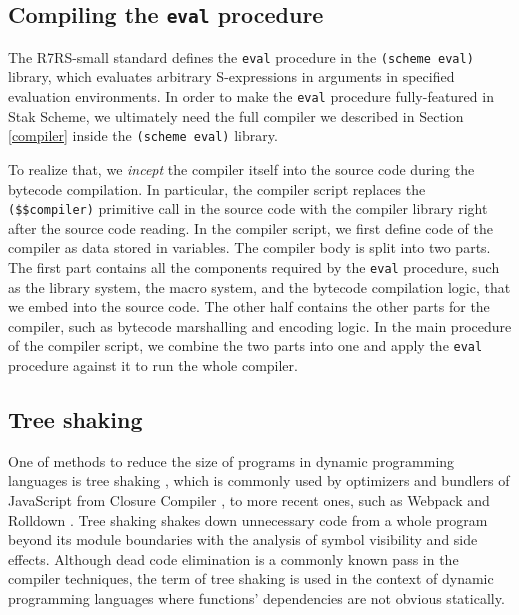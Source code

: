\documentclass[sigplan]{acmart}
\begin{document}
\subsection{Compiling the \texttt{eval} procedure} \label{inception}

The R7RS-small standard defines the \texttt{eval} procedure in the
\texttt{(scheme eval)} library, which evaluates arbitrary S-expressions in
arguments in specified evaluation environments.
In order to make the \texttt{eval} procedure fully-featured in Stak Scheme, we
ultimately need the full compiler we described in Section
\ref{compiler} inside the \texttt{(scheme eval)} library.

To realize that, we \textit{incept} the compiler itself into the
source code during the bytecode compilation.
In particular, the compiler script replaces
the \texttt{(\$\$compiler)} primitive call in the source code
with the compiler library right after the source code reading.
In the compiler script, we first define code of the compiler as
data stored in variables.
The compiler body is split into two parts.
The first part contains all the components required by the \texttt{eval}
procedure, such as the library system, the macro system, and the
bytecode compilation logic, that we embed into the source code.
The other half contains the other parts for the compiler, such
as bytecode marshalling and encoding logic.
In the main procedure of the compiler script, we combine the two
parts into one and apply the \texttt{eval} procedure against it to
run the whole compiler.

\subsection{Tree shaking}

One of methods to reduce the size of programs in dynamic programming
languages is tree shaking \cite{treeshaking}, which is commonly used
by optimizers and bundlers of JavaScript from Closure Compiler
\cite{closurecompiler}, to more recent ones, such as
Webpack \cite{webpack} and Rolldown \cite{rolldown}.
Tree shaking shakes down unnecessary code from a whole program
beyond its module boundaries with the analysis of symbol visibility
and side effects.
Although dead code elimination is a commonly known pass in the
compiler techniques, the term of tree shaking is used
in the context of dynamic programming languages where functions'
dependencies are not obvious statically.
\end{document}
